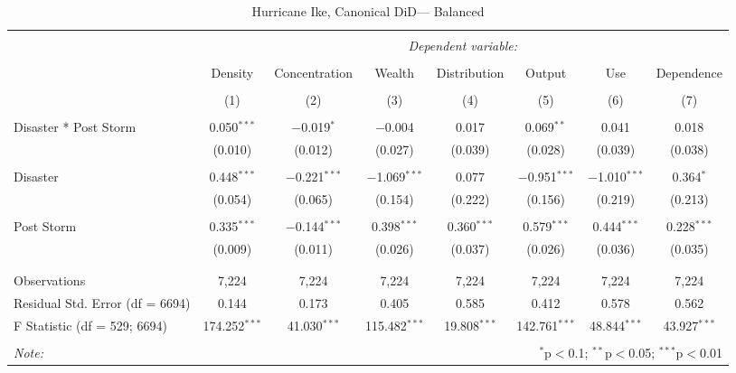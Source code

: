 
\begin{table}[!htbp] \centering 
  \caption{Hurricane Ike, Canonical DiD--- Balanced} 
  \label{} 
\footnotesize 
\begin{tabular}{@{\extracolsep{5pt}}lccccccc} 
\\[-1.8ex]\hline 
\hline \\[-1.8ex] 
 & \multicolumn{7}{c}{\textit{Dependent variable:}} \\ 
\cline{2-8} 
\\[-1.8ex] & Density & Concentration & Wealth & Distribution & Output & Use & Dependence \\ 
\\[-1.8ex] & (1) & (2) & (3) & (4) & (5) & (6) & (7)\\ 
\hline \\[-1.8ex] 
 Disaster * Post Storm & 0.050$^{***}$ & $-$0.019$^{*}$ & $-$0.004 & 0.017 & 0.069$^{**}$ & 0.041 & 0.018 \\ 
  & (0.010) & (0.012) & (0.027) & (0.039) & (0.028) & (0.039) & (0.038) \\ 
  & & & & & & & \\ 
 Disaster & 0.448$^{***}$ & $-$0.221$^{***}$ & $-$1.069$^{***}$ & 0.077 & $-$0.951$^{***}$ & $-$1.010$^{***}$ & 0.364$^{*}$ \\ 
  & (0.054) & (0.065) & (0.154) & (0.222) & (0.156) & (0.219) & (0.213) \\ 
  & & & & & & & \\ 
 Post Storm & 0.335$^{***}$ & $-$0.144$^{***}$ & 0.398$^{***}$ & 0.360$^{***}$ & 0.579$^{***}$ & 0.444$^{***}$ & 0.228$^{***}$ \\ 
  & (0.009) & (0.011) & (0.026) & (0.037) & (0.026) & (0.036) & (0.035) \\ 
  & & & & & & & \\ 
\hline \\[-1.8ex] 
Observations & 7,224 & 7,224 & 7,224 & 7,224 & 7,224 & 7,224 & 7,224 \\ 
Residual Std. Error (df = 6694) & 0.144 & 0.173 & 0.405 & 0.585 & 0.412 & 0.578 & 0.562 \\ 
F Statistic (df = 529; 6694) & 174.252$^{***}$ & 41.030$^{***}$ & 115.482$^{***}$ & 19.808$^{***}$ & 142.761$^{***}$ & 48.844$^{***}$ & 43.927$^{***}$ \\ 
\hline 
\hline \\[-1.8ex] 
\textit{Note:}  & \multicolumn{7}{r}{$^{*}$p$<$0.1; $^{**}$p$<$0.05; $^{***}$p$<$0.01} \\ 
\end{tabular} 
\end{table} 
